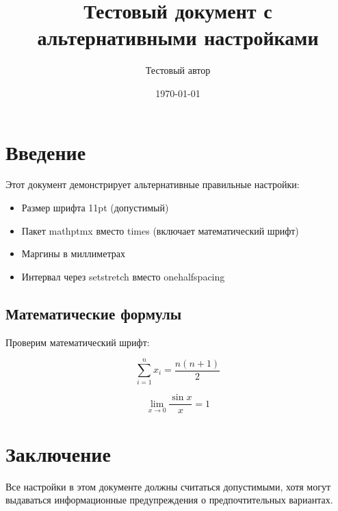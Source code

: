\documentclass[11pt,a4paper]{article} %
\title{Тестовый документ с альтернативными настройками}
\author{Тестовый автор}
\date{\today}
\begin{document}
\maketitle

\section{Введение}

Этот документ демонстрирует альтернативные правильные настройки:
\begin{itemize}
    \item Размер шрифта 11pt (допустимый)
    \item Пакет mathptmx вместо times (включает математический шрифт)
    \item Маргины в миллиметрах
    \item Интервал через setstretch вместо onehalfspacing
\end{itemize}

\subsection{Математические формулы}

Проверим математический шрифт:

$$\sum_{i=1}^{n} x_i = \frac{n(n+1)}{2}$$

$$\lim_{x \to 0} \frac{\sin x}{x} = 1$$

\section{Заключение}

Все настройки в этом документе должны считаться допустимыми, хотя могут выдаваться информационные предупреждения о предпочтительных вариантах.
\end{document}
